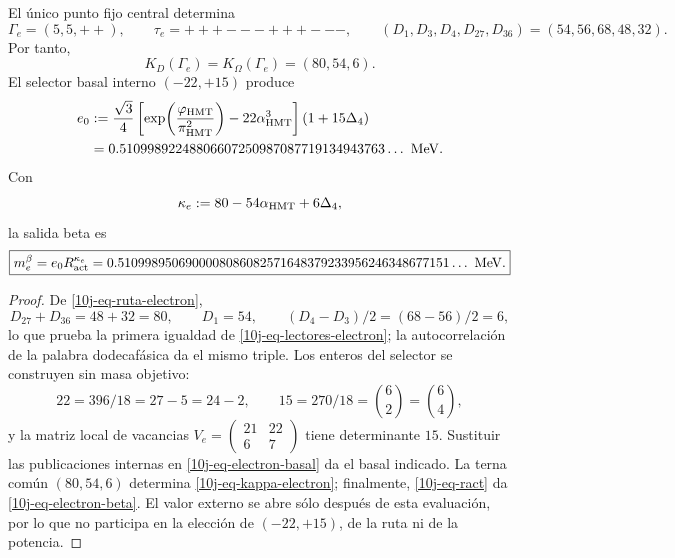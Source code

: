 \begin{theorem}
\label{10j-thm-electron}
El único punto fijo central determina
\begin{equation}
 \Gamma_e=(5,5,++),
 \qquad \tau_e=+++---+++---,
 \qquad
 (D_1,D_3,D_4,D_{27},D_{36})=(54,56,68,48,32).
 \label{10j-eq-ruta-electron}
\end{equation}
Por tanto,
\begin{equation}
 K_D(\Gamma_e)=K_\Omega(\Gamma_e)=(80,54,6).
 \label{10j-eq-lectores-electron}
\end{equation}
El selector basal interno \((-22,+15)\) produce
\begin{equation}
\begin{aligned}
 e_0&:=\frac{\sqrt3}{4}
 \left[
  \exp\!\left(\frac{\varphi_{\rm HMT}}{\pi_{\rm HMT}^2}\right)
  -22\alpha_{\rm HMT}^3
 \right](1+15\Delta_4)\\
 &=0.51099892248806607250987087719134943763\ldots\ {\rm MeV}.
\end{aligned}
 \label{10j-eq-electron-basal}
\end{equation}
Con
\begin{equation}
 \kappa_e:=80-54\alpha_{\rm HMT}+6\Delta_4,
 \label{10j-eq-kappa-electron}
\end{equation}
la salida beta es
\begin{equation}
 \boxed{
 m_e^\beta=e_0R_{\rm act}^{\kappa_e}
 =0.5109989506900008086082571648379233956246348677151\ldots\ {\rm MeV}.}
 \label{10j-eq-electron-beta}
\end{equation}
\end{theorem}

\begin{proof}
De \eqref{10j-eq-ruta-electron},
\[
 D_{27}+D_{36}=48+32=80,
 \qquad D_1=54,
 \qquad (D_4-D_3)/2=(68-56)/2=6,
\]
lo que prueba la primera igualdad de \eqref{10j-eq-lectores-electron}; la
autocorrelación de la palabra dodecafásica da el mismo triple. Los enteros
del selector se construyen sin masa objetivo:
\begin{equation}
 22=396/18=27-5=24-2,
 \qquad 15=270/18=\binom62=\binom64,
 \label{10j-eq-genealogia-22-15}
\end{equation}
y la matriz local de vacancias
\(
 V_e=\left(\begin{smallmatrix}21&22\\6&7\end{smallmatrix}\right)
\)
tiene determinante \(15\). Sustituir las publicaciones internas en
\eqref{10j-eq-electron-basal} da el basal indicado. La terna común
\((80,54,6)\) determina \eqref{10j-eq-kappa-electron}; finalmente,
\eqref{10j-eq-ract} da \eqref{10j-eq-electron-beta}. El valor externo se
abre sólo después de esta evaluación, por lo que no participa en la elección
de \((-22,+15)\), de la ruta ni de la potencia.
\end{proof}

